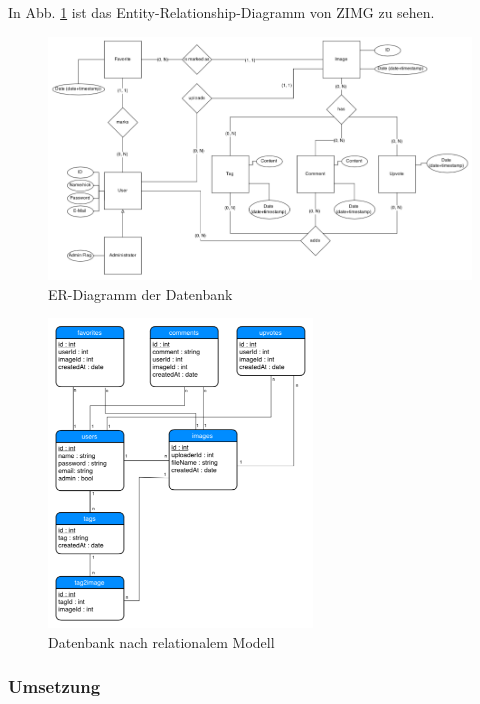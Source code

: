 \documentclass[12pt, oneside, a4paper]{article}		%
\begin{document}
In Abb. \ref{ERDiagramDatabase} ist das Entity-Relationship-Diagramm von ZIMG zu sehen.

\begin{figure}[H]
	\centering
	\includegraphics[width=\linewidth]{footage/ZIMG_ERDiagram_Database} 
	\caption{ER-Diagramm der Datenbank}
	\label{ERDiagramDatabase}
\end{figure}

\begin{figure}[H]
	\centering
	\includegraphics[width=7cm]{footage/ZIMG_RDiagram} 
	\caption{Datenbank nach relationalem Modell}
	\label{DBrelationalModel}
\end{figure}

\subsubsection{Umsetzung}
\end{document}
